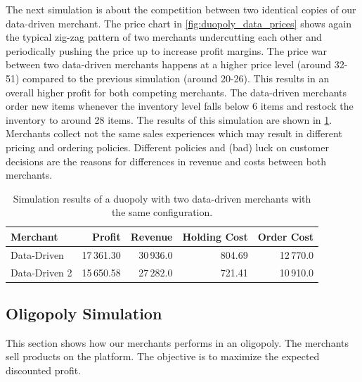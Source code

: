 The next simulation is about the competition between two identical copies of our data-driven merchant.
The price chart in \cref{fig:duopoly_data_prices} shows again the typical zig-zag pattern of two merchants undercutting each other and periodically pushing the price up to increase profit margins.
The price war between two data-driven merchants happens at a higher price level (around 32-51) compared to the previous simulation (around 20-26).
This results in an overall higher profit for both competing merchants.
The data-driven merchants order new items whenever the inventory level falls below 6 items and restock the inventory to around 28 items.
The results of this simulation are shown in \cref{tab:duopoly_data}.
Merchants collect not the same sales experiences which may result in different pricing and ordering policies.
Different policies and (bad) luck on customer decisions are the reasons for differences in revenue and costs between both merchants.

\begin{table}[t]
	\centering
	\begin{tabular}{lrrrr}
		\toprule
		\textbf{Merchant} & \textbf{Profit} & \textbf{Revenue} & \textbf{Holding Cost} & \textbf{Order Cost} \\
		\midrule
		Data-Driven   & 17\,361.30 & 30\,936.0 & 804.69 & 12\,770.0 \\
		Data-Driven 2 & 15\,650.58 & 27\,282.0 & 721.41 & 10\,910.0 \\
		\bottomrule
	\end{tabular}
	\caption{Simulation results of a duopoly with two data-driven merchants with the same configuration.}
	\label{tab:duopoly_data}
\end{table}

\subsection{Oligopoly Simulation}
This section shows how our merchants performs in an oligopoly.
The merchants sell products on the \pricewars platform.
The objective is to maximize the expected discounted profit.

